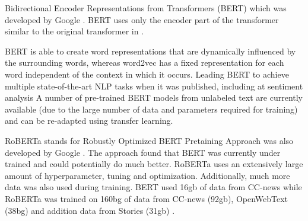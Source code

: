 Bidirectional Encoder Representations from Transformers (BERT) which was developed by Google \cite{Jacob2018}. BERT uses only the encoder part of the transformer similar to the original transformer in \cite{Vaswani2017}. 

BERT is able to create word representations that are dynamically influenced by the surrounding words, whereas word2vec has a fixed representation for each word independent of the context in which it occurs. Leading BERT to achieve multiple state-of-the-art NLP tasks when it was published, including at sentiment analysis \cite{Chiorrini2021} A number of pre-trained BERT models from unlabeled text are currently available (due to the large number of data and parameters required for training) and can be re-adapted using transfer learning. 

RoBERTa stands for Robustly Optimized BERT Pretaining Approach was also developed by Google \cite{Yinhan2019}. The approach found that BERT was currently under trained and could potentially do much better. RoBERTa uses an extensively large amount of hyperparameter, tuning and optimization. Additionally, much more data was also used during training. BERT used 16gb of data from CC-news while RoBERTa was trained on 160bg of data from CC-news (92gb), OpenWebText (38bg) and addition data from Stories (31gb) \cite{Yinhan2019}.
